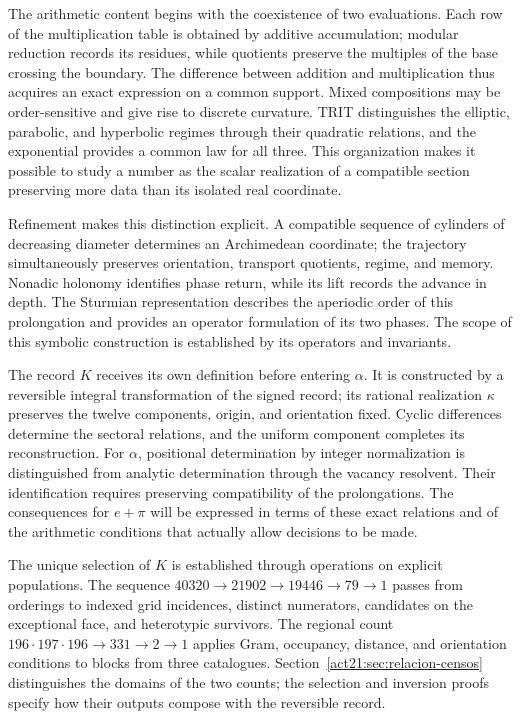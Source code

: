 The arithmetic content begins with the coexistence of two evaluations.
Each row of the multiplication table is obtained by additive accumulation;
modular reduction records its residues, while quotients preserve
the multiples of the base crossing the boundary. The difference between
addition and multiplication thus acquires an exact expression on a common support.
Mixed compositions may be order-sensitive and give rise to
discrete curvature. TRIT distinguishes the elliptic, parabolic, and
hyperbolic regimes through their quadratic relations, and the exponential provides
a common law for all three. This organization makes it possible to study a number
as the scalar realization of a compatible section preserving more data
than its isolated real coordinate.

Refinement makes this distinction explicit. A compatible sequence of
cylinders of decreasing diameter determines an Archimedean coordinate;
the trajectory simultaneously preserves orientation, transport quotients,
regime, and memory. Nonadic holonomy identifies phase return,
while its lift records the advance in depth. The Sturmian
representation describes the aperiodic order of this prolongation and provides
an operator formulation of its two phases. The scope of this symbolic
construction is established by its operators and invariants.

The record \(K\) receives its own definition before entering
\(\alpha\). It is constructed by a reversible integral transformation of the
signed record; its rational realization \(\kappa\) preserves the twelve
components, origin, and orientation fixed. Cyclic differences
determine the sectoral relations, and the uniform component completes
its reconstruction. For \(\alpha\), positional determination
by integer normalization is distinguished from analytic determination through the vacancy
resolvent. Their identification requires preserving compatibility of the
prolongations. The consequences for \(e+\pi\) will be expressed in terms
of these exact relations and of the arithmetic conditions that actually
allow decisions to be made.

The unique selection of \(K\) is established through operations on
explicit populations. The sequence
\(40320\to21902\to19446\to79\to1\) passes from orderings to
indexed grid incidences, distinct numerators, candidates on the
exceptional face, and heterotypic survivors. The regional count
\(196\cdot197\cdot196\to331\to2\to1\) applies Gram, occupancy,
distance, and orientation conditions to blocks from three catalogues.
Section~\ref{act21:sec:relacion-censos} distinguishes the domains of
the two counts; the selection and inversion proofs specify
how their outputs compose with the reversible record.

